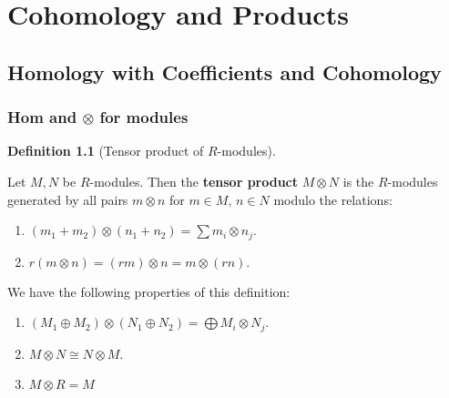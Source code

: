 \documentclass[10pt,]{book}
\newcommand{\terminology}[1]{\textbf{#1}}
\theoremstyle{plain}
\theoremstyle{definition}
\newtheorem{definition}[theorem]{Definition}
\numberwithin{equation}{section}
\begin{document}
\chapter[Cohomology and Products]{Cohomology and Products}\label{chap-cohomology-products}
\typeout{************************************************}
\typeout{************************************************}
\section[Homology with Coefficients and Cohomology]{Homology with Coefficients and Cohomology}\label{sec-homology-coefficients}
\typeout{************************************************}
\typeout{************************************************}
\subsection[Hom and \(\otimes\) for modules]{Hom and \(\otimes\) for modules}\label{subsection-9}
\begin{definition}[Tensor product of \(R\)-modules]\label{definition-21}

              Let \(M,N\) be \(R\)-modules.
              Then the \terminology{tensor product }\(M\otimes N\) is the \(R\)-modules generated by all pairs \(m\otimes n\) for \(m\in M,\,n\in N\) modulo the relations:
              \begin{enumerate}
\item{}
                  \((m_1+m_2)\otimes (n_1 + n_2) = \sum m_i \otimes n_j.\)
                \item{}
                  \(r(m\otimes n) = (rm)\otimes n = m\otimes (rn).\)
                \end{enumerate}
\end{definition}

            We have the following properties of this definition:
            \begin{enumerate}
\item{}\((M_1\oplus M_2) \otimes (N_1\oplus N_2) = \bigoplus M_i\otimes N_j\).\item{}\(M\otimes N \cong N \otimes M\).\item{}\(M\otimes R = M\)\end{enumerate}
\end{document}
